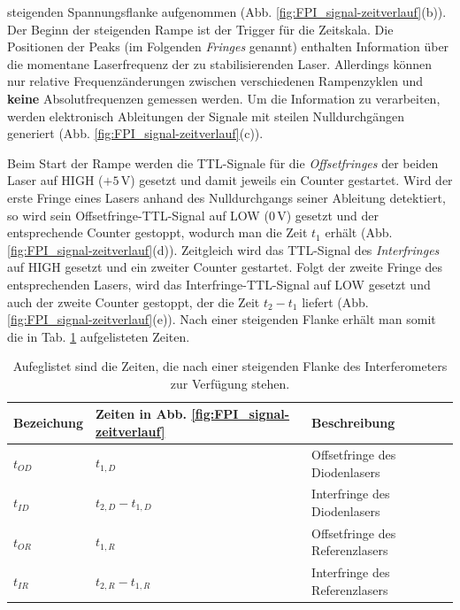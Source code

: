 steigenden Spannungsflanke aufgenommen (Abb.
\ref{fig:FPI_signal-zeitverlauf}(b)). Der Beginn der steigenden Rampe ist der
Trigger für die Zeitskala. Die Positionen der Peaks (im Folgenden
\textit{Fringes} genannt) enthalten Information über die momentane
Laserfrequenz der zu stabilisierenden Laser. Allerdings können nur relative
Frequenzänderungen zwischen verschiedenen Rampenzyklen und \textbf{keine}
Absolutfrequenzen gemessen werden. Um die Information zu verarbeiten, werden
elektronisch Ableitungen der Signale mit steilen Nulldurchgängen generiert (Abb.
\ref{fig:FPI_signal-zeitverlauf}(c)).\par
Beim Start der Rampe werden die TTL-Signale für die \textit{Offsetfringes} der
beiden Laser auf HIGH ($+5\,$V) gesetzt und damit jeweils ein Counter gestartet.
Wird der erste Fringe eines Lasers anhand des Nulldurchgangs seiner Ableitung
detektiert, so wird sein Offsetfringe-TTL-Signal auf LOW ($0\,$V) gesetzt und der
entsprechende Counter gestoppt, wodurch man die Zeit $t_1$ erhält (Abb.
\ref{fig:FPI_signal-zeitverlauf}(d)). Zeitgleich wird das TTL-Signal des
\textit{Interfringes} auf HIGH gesetzt und ein zweiter Counter gestartet.
Folgt der zweite Fringe des entsprechenden Lasers, wird das
Interfringe-TTL-Signal auf LOW gesetzt und auch der zweite Counter gestoppt,
der die Zeit $t_2-t_1$ liefert (Abb. \ref{fig:FPI_signal-zeitverlauf}(e)). Nach
einer steigenden Flanke erhält man somit die in Tab. \ref{tab:laserzeiten}
aufgelisteten Zeiten.\par
\begin{table}
	\begin{tabular}{p{}p{}p{}}
		\toprule
		Bezeichung & Zeiten in Abb. \ref{fig:FPI_signal-zeitverlauf} & Beschreibung \\
		\midrule[1px]
		\hline
		$t_{OD}$ & $t_{1,D}$ & Offsetfringe des Diodenlasers \\
		$t_{ID}$ & $t_{2,D}-t_{1,D}$ & Interfringe des Diodenlasers \\
		$t_{OR}$ & $t_{1,R}$ & Offsetfringe des Referenzlasers \\
		$t_{IR}$ & $t_{2,R}-t_{1,R}$ & Interfringe des Referenzlasers \\
		\bottomrule[1px]
	\end{tabular}
	\caption[Fringezeiten]{Aufeglistet sind die Zeiten, die nach einer steigenden
	Flanke des Interferometers zur Verfügung stehen.}
	\label{tab:laserzeiten}
\end{table}
